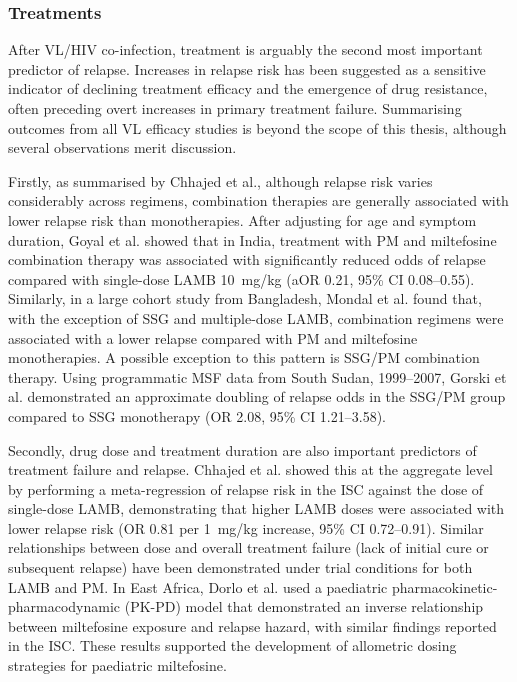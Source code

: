 \subsubsection{Treatments}
\label{sec:treatments}

After VL/HIV co-infection, treatment is arguably the second most important predictor of relapse. Increases in relapse risk has been suggested as a sensitive indicator of declining treatment efficacy and the emergence of drug resistance, often preceding overt increases in primary treatment failure\cite{vangriensven2024}. Summarising outcomes from all VL efficacy studies is beyond the scope of this thesis, although several observations merit discussion.

Firstly, as summarised by Chhajed et al., although relapse risk varies considerably across regimens, combination therapies are generally associated with lower relapse risk than monotherapies\cite{chhajed2024}. After adjusting for age and symptom duration, Goyal et al. showed that in India, treatment with PM and miltefosine combination therapy was associated with significantly reduced odds of relapse compared with single-dose LAMB 10~mg/kg (aOR 0.21, 95\% CI 0.08--0.55)\cite{goyal2019}. Similarly, in a large cohort study from Bangladesh, Mondal et al. found that, with the exception of SSG and multiple-dose LAMB, combination regimens were associated with a lower relapse  compared with PM and miltefosine monotherapies\cite{mondal2019rx}. A possible exception to this pattern is SSG/PM combination therapy. Using programmatic MSF data from South Sudan, 1999--2007, Gorski et al. demonstrated an approximate doubling of relapse odds in the SSG/PM group compared to SSG monotherapy (OR 2.08, 95\% CI 1.21--3.58)\cite{gorski2010}.

Secondly, drug dose and treatment duration are also important predictors of treatment failure and relapse. Chhajed et al. showed this at the aggregate level by performing a meta-regression of relapse risk in the ISC against the dose of single-dose LAMB, demonstrating that higher LAMB doses were associated with lower relapse risk (OR 0.81 per 1~mg/kg increase, 95\% CI 0.72--0.91)\cite{chhajed2024}. Similar relationships between dose and overall treatment failure (lack of initial cure or subsequent relapse) have been demonstrated under trial conditions for both LAMB\cite{khalil2014} and PM\cite{musa2010, hailu2010}. In East Africa, Dorlo et al. used a paediatric pharmacokinetic-pharmacodynamic (PK-PD) model that demonstrated an inverse relationship between miltefosine exposure and relapse hazard, with similar findings reported in the ISC\cite{dorlo2012}. These results supported the development of allometric dosing strategies for paediatric miltefosine\cite{dorlo2017, mbui2019}.

